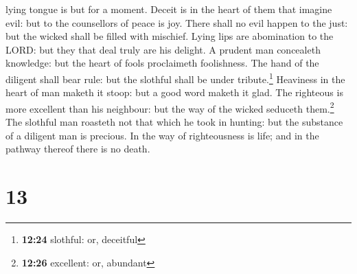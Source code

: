 lying tongue is but for a moment.  Deceit is in the heart
of them that imagine evil: but to the counsellors of peace is joy.
 There shall no evil happen to the just: but the wicked
shall be filled with mischief.  Lying lips are
abomination to the LORD: but they that deal truly are his delight.
 A prudent man concealeth knowledge: but the heart of
fools proclaimeth foolishness.  The hand of the diligent
shall bear rule: but the slothful shall be under tribute.\footnote{\textbf{12:24}
  slothful: or, deceitful}  Heaviness in the heart of man
maketh it stoop: but a good word maketh it glad.  The
righteous is more excellent than his neighbour: but the way of the
wicked seduceth them.\footnote{\textbf{12:26} excellent: or, abundant}
 The slothful man roasteth not that which he took in
hunting: but the substance of a diligent man is precious.
 In the way of righteousness is life; and in the pathway
thereof there is no death.

\hypertarget{section-12}{%
\section{13}\label{section-12}}

